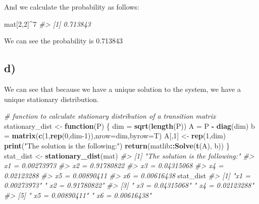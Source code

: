 \documentclass[]{article}
\newenvironment{Shaded}{\begin{snugshade}}{\end{snugshade}}
\newcommand{\CommentTok}[1]{\textcolor[rgb]{0.56,0.35,0.01}{\textit{#1}}}
\newcommand{\ControlFlowTok}[1]{\textcolor[rgb]{0.13,0.29,0.53}{\textbf{#1}}}
\newcommand{\DataTypeTok}[1]{\textcolor[rgb]{0.13,0.29,0.53}{#1}}
\newcommand{\DecValTok}[1]{\textcolor[rgb]{0.00,0.00,0.81}{#1}}
\newcommand{\KeywordTok}[1]{\textcolor[rgb]{0.13,0.29,0.53}{\textbf{#1}}}
\newcommand{\NormalTok}[1]{#1}
\newcommand{\OperatorTok}[1]{\textcolor[rgb]{0.81,0.36,0.00}{\textbf{#1}}}
\newcommand{\StringTok}[1]{\textcolor[rgb]{0.31,0.60,0.02}{#1}}
\begin{document}
And we calculate the probability as follows:

\begin{Shaded}
\begin{Highlighting}[]
\NormalTok{mat[}\DecValTok{2}\NormalTok{,}\DecValTok{2}\NormalTok{]}\OperatorTok{^}\DecValTok{7}
\CommentTok{#> [1] 0.713843}
\end{Highlighting}
\end{Shaded}

We can see the probability is 0.713843

\hypertarget{d}{%
\subsection{d)}\label{d}}

We can see that because we have a unique solution to the system, we have
a unique stationary distribution.

\begin{Shaded}
\begin{Highlighting}[]
\CommentTok{# function to calculate stationary distribution of a transition matrix}
\NormalTok{stationary_dist <-}\StringTok{ }\ControlFlowTok{function}\NormalTok{(P) \{}
\NormalTok{    dim =}\StringTok{ }\KeywordTok{sqrt}\NormalTok{(}\KeywordTok{length}\NormalTok{(P))}
\NormalTok{    A =}\StringTok{ }\NormalTok{P }\OperatorTok{-}\StringTok{ }\KeywordTok{diag}\NormalTok{(dim)}
\NormalTok{    b =}\StringTok{ }\KeywordTok{matrix}\NormalTok{(}\KeywordTok{c}\NormalTok{(}\DecValTok{1}\NormalTok{,}\KeywordTok{rep}\NormalTok{(}\DecValTok{0}\NormalTok{,dim}\DecValTok{-1}\NormalTok{)),}\DataTypeTok{nrow=}\NormalTok{dim,}\DataTypeTok{byrow=}\NormalTok{T)}
\NormalTok{    A[,}\DecValTok{1}\NormalTok{] <-}\StringTok{ }\KeywordTok{rep}\NormalTok{(}\DecValTok{1}\NormalTok{,dim)}
    \KeywordTok{print}\NormalTok{(}\StringTok{"The solution is the following:"}\NormalTok{)}
    \KeywordTok{return}\NormalTok{(matlib}\OperatorTok{::}\KeywordTok{Solve}\NormalTok{(}\KeywordTok{t}\NormalTok{(A), b))}
\NormalTok{\}}
\NormalTok{stat_dist <-}\StringTok{ }\KeywordTok{stationary_dist}\NormalTok{(mat)}
\CommentTok{#> [1] "The solution is the following:"}
\CommentTok{#> x1            =  0.00273973 }
\CommentTok{#>   x2          =  0.91780822 }
\CommentTok{#>     x3        =  0.04315068 }
\CommentTok{#>       x4      =  0.02123288 }
\CommentTok{#>         x5    =  0.00890411 }
\CommentTok{#>           x6  =  0.00616438}
\NormalTok{stat_dist}
\CommentTok{#> [1] "x1            =  0.00273973" "  x2          =  0.91780822"}
\CommentTok{#> [3] "    x3        =  0.04315068" "      x4      =  0.02123288"}
\CommentTok{#> [5] "        x5    =  0.00890411" "          x6  =  0.00616438"}
\end{Highlighting}
\end{Shaded}
\end{document}
